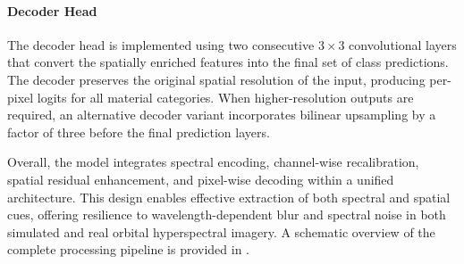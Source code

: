 \documentclass[12pt]{elsarticle}
\begin{document}
\paragraph{Decoder Head}

The decoder head is implemented using two consecutive \(3\times3\) convolutional layers that convert the spatially enriched features into the final set of class predictions. The decoder preserves the original spatial resolution of the input, producing per-pixel logits for all material categories. When higher-resolution outputs are required, an alternative decoder variant incorporates bilinear upsampling by a factor of three before the final prediction layers.

Overall, the model integrates spectral encoding, channel-wise recalibration, spatial residual enhancement, and pixel-wise decoding within a unified architecture. This design enables effective extraction of both spectral and spatial cues, offering resilience to wavelength-dependent blur and spectral noise in both simulated and real orbital hyperspectral imagery. A schematic overview of the complete processing pipeline is provided in .
\end{document}
